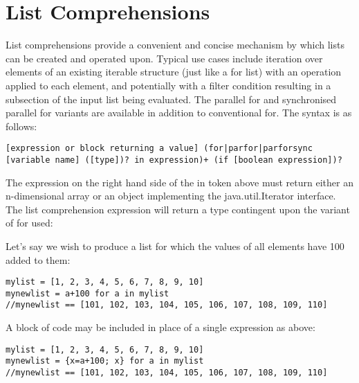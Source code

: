 \documentclass[conc-doc]{subfiles}
\begin{document}
	
	\chapter[List Comprehensions]{List Comprehensions}
	\label{ch:listComp}
List comprehensions provide a convenient and concise mechanism by which lists can be created and operated upon. Typical use cases include iteration over elements of an existing iterable structure (just like a for list) with an operation applied to each element, and potentially with a filter condition resulting in a subsection of the input list being evaluated. The parallel for and synchronised parallel for variants are available in addition to conventional for. The syntax is as follows:

\begin{center}
	\lstinline{[expression or block returning a value] (for|parfor|parforsync [variable name] ([type])? in expression)+ (if [boolean expression])?}
\end{center}


The expression on the right hand side of the in token above must return either an n-dimensional array or an object implementing the java.util.Iterator interface. The list comprehension expression will return a type contingent upon the variant of for used:

\begin{table}[H]
	\centering
\end{table}


Let's say we wish to produce a list for which the values of all elements have 100 added to them:
\begin{lstlisting}
mylist = [1, 2, 3, 4, 5, 6, 7, 8, 9, 10]
mynewlist = a+100 for a in mylist
//mynewlist == [101, 102, 103, 104, 105, 106, 107, 108, 109, 110]
\end{lstlisting}

A block of code may be included in place of a single expression as above:
\begin{lstlisting}
mylist = [1, 2, 3, 4, 5, 6, 7, 8, 9, 10]
mynewlist = {x=a+100; x} for a in mylist
//mynewlist == [101, 102, 103, 104, 105, 106, 107, 108, 109, 110]
\end{lstlisting}
\end{document}
